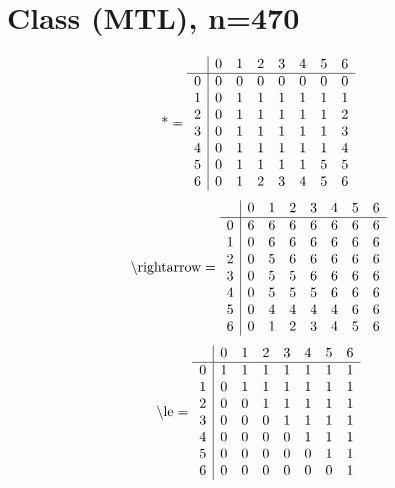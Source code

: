 \documentclass[11pt]{article}
\begin{document}
\section{Class (MTL), n=470}
\[\text{*} = 
\begin{array}{r | r r r r r r r}
 & 0 & 1 & 2 & 3 & 4 & 5 & 6 \\ \hline
0 & 0 & 0 & 0 & 0 & 0 & 0 & 0 \\
1 & 0 & 1 & 1 & 1 & 1 & 1 & 1 \\
2 & 0 & 1 & 1 & 1 & 1 & 1 & 2 \\
3 & 0 & 1 & 1 & 1 & 1 & 1 & 3 \\
4 & 0 & 1 & 1 & 1 & 1 & 1 & 4 \\
5 & 0 & 1 & 1 & 1 & 1 & 5 & 5 \\
6 & 0 & 1 & 2 & 3 & 4 & 5 & 6 \\
\end{array}
\]
\[\text{\textbackslash rightarrow} = 
\begin{array}{r | r r r r r r r}
 & 0 & 1 & 2 & 3 & 4 & 5 & 6 \\ \hline
0 & 6 & 6 & 6 & 6 & 6 & 6 & 6 \\
1 & 0 & 6 & 6 & 6 & 6 & 6 & 6 \\
2 & 0 & 5 & 6 & 6 & 6 & 6 & 6 \\
3 & 0 & 5 & 5 & 6 & 6 & 6 & 6 \\
4 & 0 & 5 & 5 & 5 & 6 & 6 & 6 \\
5 & 0 & 4 & 4 & 4 & 4 & 6 & 6 \\
6 & 0 & 1 & 2 & 3 & 4 & 5 & 6 \\
\end{array}
\]
\[\text{\textbackslash le} = 
\begin{array}{r | r r r r r r r}
 & 0 & 1 & 2 & 3 & 4 & 5 & 6 \\ \hline
0 & 1 & 1 & 1 & 1 & 1 & 1 & 1 \\
1 & 0 & 1 & 1 & 1 & 1 & 1 & 1 \\
2 & 0 & 0 & 1 & 1 & 1 & 1 & 1 \\
3 & 0 & 0 & 0 & 1 & 1 & 1 & 1 \\
4 & 0 & 0 & 0 & 0 & 1 & 1 & 1 \\
5 & 0 & 0 & 0 & 0 & 0 & 1 & 1 \\
6 & 0 & 0 & 0 & 0 & 0 & 0 & 1 \\
\end{array}
\]
\end{document}
